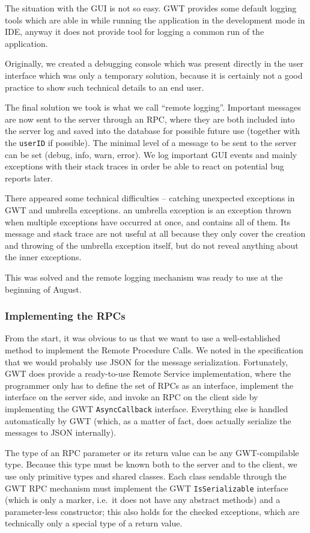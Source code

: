 The situation with the GUI is not so easy. GWT provides some default logging tools which are able in while running the application in the development mode in IDE, anyway it does not provide tool for logging a common run of the application.

Originally, we created a debugging console which was present directly in the user interface which was only a temporary solution, because it is 
certainly not a good practice to show such technical details to an end user.

The final solution we took is what we call ``remote logging''. Important messages are now sent to the server through an RPC, where they are both included into the server log and saved into the database for possible future use (together with the {\tt userID} if possible).
The minimal level of a message to be sent to the server can be set (debug, info, warn, error). We log important GUI events and mainly exceptions with their stack traces in order be able to react on potential bug reports later.

There appeared some technical difficulties -- catching unexpected exceptions in GWT and umbrella exceptions. an umbrella exception is an exception thrown when multiple exceptions have occurred at once, and contains all of them. Its message and stack trace are not useful at all because they only cover the creation and throwing of the umbrella exception itself, but do not reveal anything about the inner exceptions.

This was solved and the remote logging mechanism was ready to use at the beginning of August.

\subsubsection{Implementing the RPCs}

From the start, it was obvious to us that we want to use a well-established method to implement the Remote Procedure Calls.
We noted in the specification that we would probably use JSON for the message serialization.
Fortunately, GWT does provide a ready-to-use Remote Service implementation, where the programmer only has to define the set of RPCs as an interface, implement the interface on the server side, and invoke an RPC on the client side by implementing the GWT {\tt AsyncCallback} interface.
Everything else is handled automatically by GWT (which, as a matter of fact, does actually serialize the messages to JSON internally).

The type of an RPC parameter or its return value can be any GWT-compilable type. Because this type must be known both to the server and to the client, we use only primitive types and shared classes. Each class sendable through the GWT RPC mechanism must implement the GWT {\tt IsSerializable} interface (which is only a marker, i.e.\ it does not have any abstract methods) and a parameter-less constructor; this also holds for the checked exceptions, which are technically only a special type of a return value.

